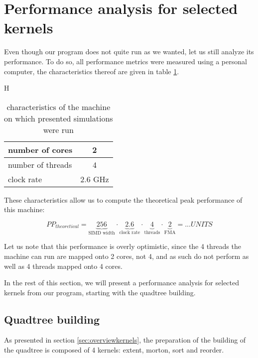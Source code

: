 \documentclass[a4paper,12pt,twoside]{article}
\begin{document}
\section{Performance analysis for selected kernels} \label{sec:perfanal}

Even though our program does not quite run as we wanted, let us still analyze its performance. To do so, all performance metrics were measured using a personal computer, the characteristics thereof are given in table \ref{tab:parametersPC}.

\begin{table}{H}
\begin{center}\begin{tabular}{|l|c|} \hline
number of cores & 2 \\ \hline
number of threads & 4 \\ \hline
clock rate & 2.6 GHz \\ \hline
\end{tabular}\end{center}
\caption{characteristics of the machine on which presented simulations were run}
\label{tab:parametersPC}
\end{table}

These characteristics allow us to compute the theoretical peak performance of this machine: 

\begin{equation}
	PP_{theoretical} = 
	\underbrace{256}_\text{SIMD width} \cdot
	\underbrace{2.6}_\text{clock rate} \cdot
	\underbrace{4}_\text{threads} \cdot 
	\underbrace{2}_\text{FMA}
	= 
	... UNITS
	\label{eq:peakperf}
\end{equation}

Let us note that this performance is overly optimistic, since the 4 threads the machine can run are mapped onto 2 cores, not 4, and as such do not perform as well as 4 threads mapped onto 4 cores.

In the rest of this section, we will present a performance analysis for selected kernels from our program, starting with the quadtree building. 

\subsection{Quadtree building} \label{sec:perf:quadtree}

As presented in section \ref{sec:overviewkernels}, the preparation of the building of the quadtree is composed of 4 kernels: extent, morton, sort and reorder.
\end{document}
